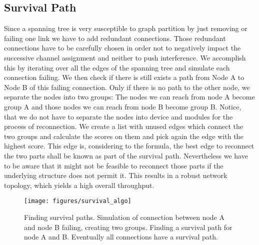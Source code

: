   \subsection{Survival Path}
  Since a spanning tree is very susceptible to graph partition by just removing or failing one link we have to add redundant connections.
  Those redundant connections have to be carefully chosen in order not to negatively impact the successive channel assignment and neither to push interference.
  We accomplish this by iterating over all the edges of the spanning tree and simulate each connection failing. We then check if there is still exists 
  a path from Node A to Node B of this failing connection. Only if there is no path to the other node, we separate the nodes into two groups:
  The nodes we can reach from node A become group A and those nodes we can reach from node B become group B.
  Notice, that we do not have to separate the nodes into device and modules for the process of reconnection.
  We create a list with unused edges which connect the two groups and calculate the scores on them and pick again the edge with the highest score.
  This edge is, considering to the formula, the best edge to reconnect the two parts shall be known as part of the survival path.
  Nevertheless we have to be aware that it might not be feasible to reconnect those parts if the underlying structure does not permit it.
  This results in a robust network topology, which yields a high overall throughput.
  \begin{figure}[h]
    \centering
    \texttt{[image: figures/survival\_algo]}
    \caption{Finding survival paths. Simulation of connection between node A and node B failing, creating two groups.
    Finding a survival path for node A and B. Eventually all connections have a survival path.}
    \label{fig:survival_algo}
  \end{figure}

